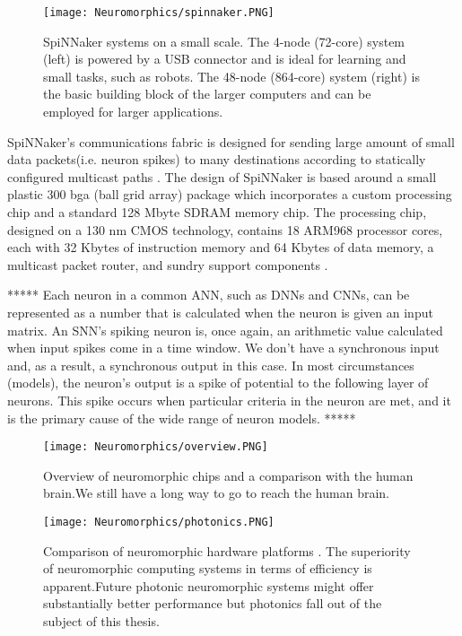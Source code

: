 \documentclass[12pt]{report}
\begin{document}
\begin{figure}[htp]
    \centering
    \texttt{[image: Neuromorphics/spinnaker.PNG]}
    \caption{SpiNNaker systems on a small scale. The 4-node (72-core) system (left) is powered by a USB connector and is ideal for learning and small tasks, such as robots. The 48-node (864-core) system (right) is the basic building block of the larger computers and can be employed for larger applications.}
    \label{fig:spinnaker}
\end{figure}

SpiNNaker's communications fabric is designed for sending large amount of small data packets(i.e. neuron spikes) to many destinations according to statically configured multicast paths \cite{plana2011}.
The design of SpiNNaker is based around a small plastic 300 bga (ball grid array) package which incorporates a custom processing chip  and a standard 128 Mbyte SDRAM memory chip. The processing chip, designed on a 130 nm CMOS technology, contains 18 ARM968 processor cores, each with 32 Kbytes of instruction memory and 64 Kbytes of data memory, a multicast packet router, and sundry support components \cite{painkras2013} \cite{furber2016}.

*****
Each neuron in a common ANN, such as DNNs and CNNs, can be represented as a number that is calculated when the neuron is given an input matrix. An SNN's spiking neuron is, once again, an arithmetic value calculated when input spikes come in a time window. We don't have a synchronous input and, as a result, a synchronous output in this case. In most circumstances (models), the neuron's output is a spike of potential to the following layer of neurons. This spike occurs when particular criteria in the neuron are met, and it is the primary cause of the wide range of neuron models.
*****
\begin{figure}[htp]
    \centering
    \texttt{[image: Neuromorphics/overview.PNG]}
    \caption{Overview of neuromorphic chips and a comparison with the human brain.We still have a long way to go to reach the human brain.}
    \label{fig:overview}
\end{figure}

\begin{figure}[htp]
    \centering
    \texttt{[image: Neuromorphics/photonics.PNG]}
    \caption{Comparison of neuromorphic hardware platforms . The superiority of neuromorphic computing systems in terms of efficiency is apparent.Future photonic neuromorphic systems might offer substantially better performance but photonics fall out of the subject of this thesis.\cite{shastri2018}}
    \label{fig:overview}
\end{figure}
\end{document}
